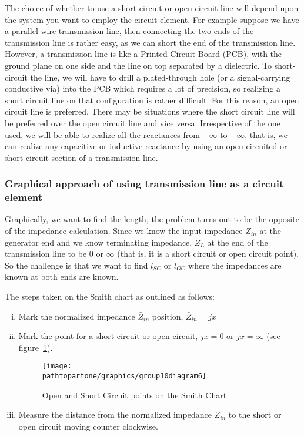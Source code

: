 The choice of whether to use a short circuit or open circuit line will depend upon the system you want to employ the circuit element. For example suppose we have a parallel wire transmission line, then connecting the two ends of the transmission line is rather easy, as we can short the end of the transmission line. However, a transmission line is like a Printed Circuit Board (PCB), with the ground plane on one side and the line on top separated by a dielectric. To short-circuit the line, we will have to drill a plated-through hole (or a signal-carrying conductive via) into the PCB which requires a lot of precision, so realizing a short circuit line on that configuration is rather difficult. For this reason, an open circuit line is preferred. There may be situations where the short circuit line will be preferred over the open circuit line and vice versa. Irrespective of the one used, we will be able to realize all the reactances from $ -\infty$ to $+\infty $, that is, we can realize any capacitive or inductive reactance by using an open-circuited or short circuit section of a transmission line.

\subsubsection{Graphical approach of using transmission line as a circuit element}
Graphically, we want to find the length, the problem turns out to be the opposite of the impedance calculation. Since we know the input impedance $Z_{in}$ at the generator end and we know terminating impedance, $Z_{L}$ at the end of the transmission line to be 0 or $\infty$ (that is, it is a short circuit or open circuit point). So the challenge is that we want to find $ l_{SC} $ or $ l_{OC} $ where the impedances are known at both ends are known.

The steps taken on the Smith chart as outlined as follows:
\begin{enumerate}[(i)]
\item Mark the normalized impedance $\bar{Z}_{in}$ position, $\bar{Z}_{in} = jx$
\item Mark the point for a short circuit or open circuit, $jx = 0$ or $jx = \infty$ (see figure~\ref{fig:group10diagram6}).
\begin{figure}[h]
\centering
\texttt{[image: \\pathtopartone/graphics/group10diagram6]}
\caption{Open and Short Circuit points on the Smith Chart}
\label{fig:group10diagram6}
\end{figure}

\item Measure the distance from the normalized impedance $\bar{Z}_{in}$ to the short or open circuit moving counter clockwise. 
\end{enumerate}

